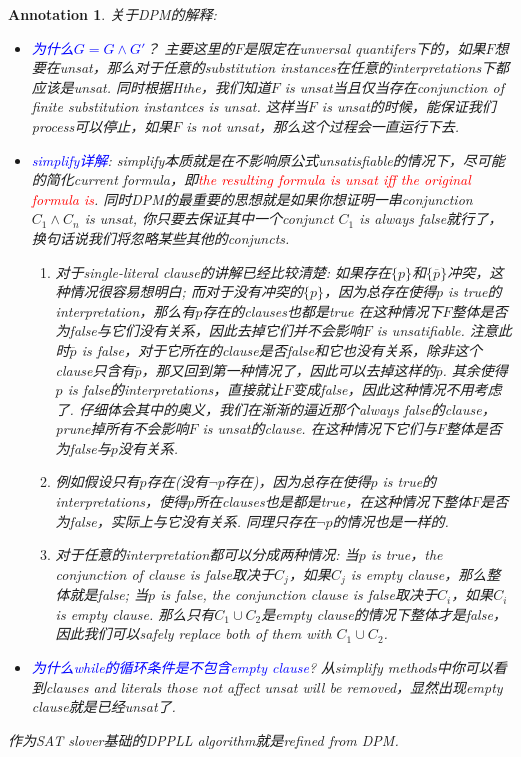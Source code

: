 \documentclass{article}
\theoremstyle{plain}
\newtheorem{annotation}[theorem]{Annotation}
\theoremstyle{nonumberplain}
\newcommand{\redt}[1]{\textcolor{red}{#1}}
\newcommand{\bluet}[1]{\textcolor{blue}{#1}}
\begin{document}
\begin{annotation}
\rm 关于DPM的解释: 
\begin{itemize}
	\item \bluet{为什么$G = G \wedge G'$}？ 主要这里的$F$是限定在unversal quantifers下的，如果$F$想要在unsat，那么对于任意的substitution instances在任意的interpretations下都应该是unsat. 同时根据Hthe，我们知道$F$ is unsat当且仅当存在conjunction of finite substitution instantces is unsat. 这样当$F$ is unsat的时候，能保证我们process可以停止，如果$F$ is not unsat，那么这个过程会一直运行下去. 
	\item \bluet{simplify详解}: simplify本质就是在不影响原公式unsatisfiable的情况下，尽可能的简化current formula，即\redt{the resulting formula is unsat iff the original formula is}. 同时DPM的最重要的思想就是如果你想证明一串conjunction $C_1 \wedge C_n$ is unsat, 你只要去保证其中一个conjunct $C_1$ is always false就行了，换句话说我们将忽略某些其他的conjuncts.
	\begin{enumerate}
		\item 对于single-literal clause的讲解已经比较清楚: 如果存在$\{p\}$和$\{\overline{p}\}$冲突，这种情况很容易想明白; 而对于没有冲突的$\{p\}$，因为总存在使得$p$ is true的interpretation，那么有$p$存在的clauses也都是true 在这种情况下$F$整体是否为false与它们没有关系，因此去掉它们并不会影响$F$ is unsatifiable. 注意此时$\overline{p}$ is false，对于它所在的clause是否false和它也没有关系，除非这个clause只含有$\overline{p}$，那又回到第一种情况了，因此可以去掉这样的$\overline{p}$. 其余使得$p$ is false的interpretations，直接就让$F$变成false，因此这种情况不用考虑了. 仔细体会其中的奥义，我们在渐渐的逼近那个always false的clause，prune掉所有不会影响$F$ is unsat的clause.
		在这种情况下它们与$F$整体是否为false与$p$没有关系. 
		\item 例如假设只有$p$存在(没有$\neg p$存在)，因为总存在使得$p$ is true的interpretations，使得$p$所在clauses也是都是true，在这种情况下整体$F$是否为false，实际上与它没有关系. 同理只存在$\neg p$的情况也是一样的. 
		\item 对于任意的interpretation都可以分成两种情况: 当$p$ is true，the conjunction of clause is false取决于$C_j$，如果$C_j$ is empty clause，那么整体就是false; 当$p$ is false, the conjunction clause is false取决于$C_i$，如果$C_i$ is empty clause. 那么只有$C_1 \cup C_2$是empty clause的情况下整体才是false，因此我们可以safely replace both of them with $C_1 \cup C_2$. 
	\end{enumerate}
	\item \bluet{为什么while的循环条件是不包含\emph{empty clause}}? 从simplify methods中你可以看到clauses and literals those not affect unsat will be removed，显然出现empty clause就是已经unsat了.
\end{itemize}
作为SAT slover基础的DPPLL algorithm就是refined from DPM.
\end{annotation}
\end{document}
